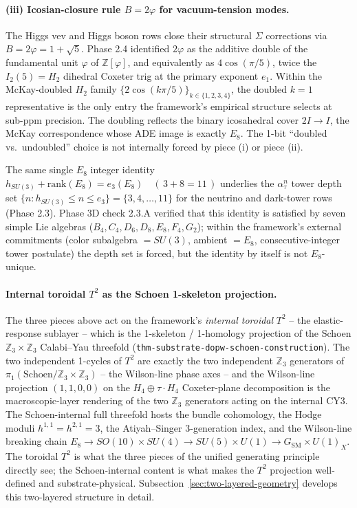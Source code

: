 ﻿\documentclass[reprint,amsmath,amssymb,aps,prd,longbibliography,floatfix]{revtex4-2}
\begin{document}
\paragraph{(iii) Icosian-closure rule $B = 2\varphi$ for vacuum-tension
modes.} The Higgs vev and Higgs boson rows close their structural
$\Sigma$ corrections via $B = 2\varphi = 1 + \sqrt{5}$. Phase 2.4
identified $2\varphi$ as the additive double of the fundamental unit
$\varphi$ of $\mathbb{Z}[\varphi]$, and equivalently as
$4\cos(\pi/5)$, twice the $I_2(5) = H_2$ dihedral Coxeter trig at the
primary exponent $e_1$. Within the McKay-doubled $H_2$ family
$\{2\cos(k\pi/5)\}_{k \in \{1, 2, 3, 4\}}$, the doubled $k = 1$
representative is the only entry the framework's empirical structure
selects at sub-ppm precision. The doubling reflects the binary
icosahedral cover $2I \to I$, the McKay correspondence whose ADE image
is exactly $E_8$. The 1-bit ``doubled vs.\ undoubled'' choice is not
internally forced by piece (i) or piece (ii).

The same single $E_8$ integer identity
\(
  h_{SU(3)} + \mathrm{rank}(E_8) = e_3(E_8)
  \quad (\,3 + 8 = 11\,)
\)
underlies the $\alpha_\tau^n$ tower depth set
$\{n : h_{SU(3)} \le n \le e_3\} = \{3, 4, \dots, 11\}$ for the
neutrino and dark-tower rows (Phase 2.3). Phase 3D check 2.3.A
verified that this identity is satisfied by seven simple Lie algebras
($B_4, C_4, D_6, D_8, E_8, F_4, G_2$); within the framework's external
commitments (color subalgebra $= SU(3)$, ambient $= E_8$,
consecutive-integer tower postulate) the depth set is forced, but the
identity by itself is not $E_8$-unique.

\paragraph{Internal toroidal $T^2$ as the Schoen 1-skeleton projection.}
The three pieces above act on the framework's \emph{internal toroidal}
$T^2$ -- the elastic-response sublayer -- which is the 1-skeleton /
1-homology projection of the Schoen $\mathbb{Z}_3 \times \mathbb{Z}_3$
Calabi--Yau threefold (\texttt{thm-substrate-dopw-schoen-construction}).
The two independent 1-cycles of $T^2$ are exactly the two independent
$\mathbb{Z}_3$ generators of $\pi_1(\mathrm{Schoen}/\mathbb{Z}_3
\times \mathbb{Z}_3)$ -- the Wilson-line phase axes -- and the
Wilson-line projection $(1, 1, 0, 0)$ on the
$H_4 \oplus \tau \cdot H_4$ Coxeter-plane decomposition is the
macroscopic-layer rendering of the two $\mathbb{Z}_3$ generators
acting on the internal CY3. The Schoen-internal full threefold hosts
the bundle cohomology, the Hodge moduli $h^{1,1} = h^{2,1} = 3$, the
Atiyah--Singer 3-generation index, and the Wilson-line breaking chain
$E_8 \to SO(10) \times SU(4) \to SU(5) \times U(1) \to G_\mathrm{SM}
\times U(1)_X$. The toroidal $T^2$ is what the three pieces of the
unified generating principle directly see; the Schoen-internal
content is what makes the $T^2$ projection well-defined and
substrate-physical. Subsection~\ref{sec:two-layered-geometry}
develops this two-layered structure in detail.
\end{document}
